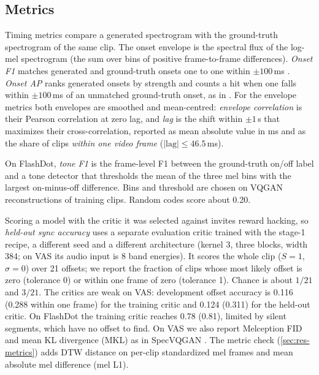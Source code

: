 \subsection{Metrics}
\label{sec:metrics}

Timing metrics compare a generated spectrogram with the ground-truth spectrogram of the same clip. The onset envelope is the spectral flux of the log-mel spectrogram (the sum over bins of positive frame-to-frame differences). \emph{Onset F1} matches generated and ground-truth onsets one to one within $\pm 100$\,ms \citep{raffel2014mireval}. \emph{Onset AP} ranks generated onsets by strength and counts a hit when one falls within $\pm 100$\,ms of an unmatched ground-truth onset, as in \citet{du2023conditional}. For the envelope metrics both envelopes are smoothed and mean-centred: \emph{envelope correlation} is their Pearson correlation at zero lag, and \emph{lag} is the shift within $\pm 1$\,s that maximizes their cross-correlation, reported as mean absolute value in ms and as the share of clips \emph{within one video frame} ($|\mathrm{lag}| \le 46.5$\,ms).

On FlashDot, \emph{tone F1} is the frame-level F1 between the ground-truth on/off label and a tone detector that thresholds the mean of the three mel bins with the largest on-minus-off difference. Bins and threshold are chosen on VQGAN reconstructions of training clips. Random codes score about 0.20.

Scoring a model with the critic it was selected against invites reward hacking, so \emph{held-out sync accuracy} uses a separate evaluation critic trained with the stage-1 recipe, a different seed and a different architecture (kernel 3, three blocks, width 384; on VAS its audio input is 8 band energies). It scores the whole clip ($S = 1$, $\sigma = 0$) over 21 offsets; we report the fraction of clips whose most likely offset is zero (tolerance 0) or within one frame of zero (tolerance 1). Chance is about $1/21$ and $3/21$. The critics are weak on VAS: development offset accuracy is 0.116 (0.288 within one frame) for the training critic and 0.124 (0.311) for the held-out critic. On FlashDot the training critic reaches 0.78 (0.81), limited by silent segments, which have no offset to find. On VAS we also report Melception FID and mean KL divergence (MKL) as in SpecVQGAN \citep{iashin2021taming}. The metric check (\cref{sec:res-metrics}) adds DTW distance on per-clip standardized mel frames \citep{salvador2007fastdtw} and mean absolute mel difference (mel L1).

